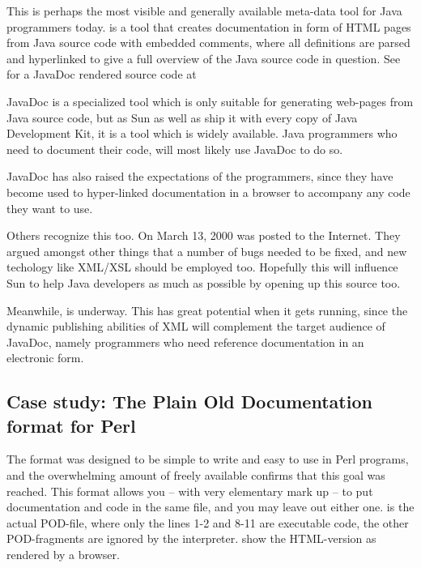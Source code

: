 This is perhaps the most visible and generally available meta-data
tool for Java programmers today.
is a tool that creates documentation in form of HTML pages from Java
source code with embedded comments, where all definitions are parsed
and hyperlinked to give a full overview of the Java source code in
question.  See  for a JavaDoc rendered source
code at 

JavaDoc is a specialized tool which is only suitable for generating
web-pages from Java source code, but as Sun
 as well as ship it with
every copy of Java Development Kit, it is a tool which is widely
available.  Java programmers who need to document their code, will most
likely use JavaDoc to do so.

JavaDoc has also raised the expectations of the programmers, since
they have become used to hyper-linked documentation in a browser to
accompany any code they want to use.  

Others recognize this too.  On March 13, 2000
 was posted to the Internet.  They argued
amongst other things that a number of bugs needed to be
fixed, and new techology like XML/XSL should be employed
too.  Hopefully this will influence Sun to help Java
developers as much as possible by opening up this source
too.

Meanwhile,  is underway.
This has great potential when it gets running, since the dynamic
publishing abilities of XML will complement the target audience of
  JavaDoc, namely programmers who need reference documentation in an
  electronic form.

\subsection{Case study: The Plain Old Documentation format for Perl}
\label{sec:perlpod}

The
format was designed to be simple to write and easy to use in
Perl programs, and the overwhelming amount of freely
available  confirms that this goal was reached.  This format
allows you -- with very elementary mark up -- to put
documentation and code in the same file, and you may leave
out either one.   is the
actual POD-file, where only the lines 1-2 and 8-11 are executable
code, the other POD-fragments are ignored by the interpreter.
 show the HTML-version as
rendered by a browser.


